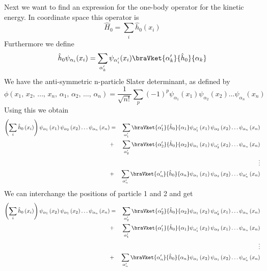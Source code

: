 Next we want to find an expression for the one-body operator for the kinetic energy. In coordinate space this operator is
\[
	\hat{H}_{0}=\sum_{i}\hat{h}_{0}(x_{i})
\]
Furthermore we define
\[
	\hat{h}_{0}\psi_{\alpha_{i}}(x_{i})=\sum_{\alpha_{k}'}\psi_{\alpha_{i}'}(x_{i}) \braVket{\alpha_{k}'}{\hat{h}_{0}}{\alpha_{k}}
\]
We have the anti-symmetric n-particle Slater determinant, as defined by
\[
	\phi\left(x_{1},\, x_{2},\,\dots,\, x_{n},\,\alpha_{1},\,\alpha_{2},\,\dots,\,\alpha_{n}\right)=\frac{1}{\sqrt{n!}}\sum_{p}\left(-1\right)^{p}\psi_{\alpha_{1}}\left(x_{1}\right)\psi_{\alpha_{2}}\left(x_{2}\right)\dots\psi_{\alpha_{n}}\left(x_{n}\right)
\]
Using this we obtain
\footnotesize
\begin{eqnarray*}
	\left(\sum_{i}\hat{h}_{0}\left(x_{i}\right)\right)\psi_{\alpha_{1}}\left(x_{1}\right)\psi_{\alpha_{2}}\left(x_{2}\right)\dots\psi_{\alpha_{n}}\left(x_{n}\right) & = & \sum_{\alpha_{1}'}\braVket{\alpha_{1}'}{\hat{h}_{0}}{\alpha_{1}}\psi_{\alpha_{1}'}\left(x_{1}\right)\psi_{\alpha_{2}}\left(x_{2}\right)\dots\psi_{\alpha_{n}}\left(x_{n}\right)\\
	 & + & \sum_{\alpha_{2}'}\braVket{\alpha_{2}'}{\hat{h}_{0}}{\alpha_{2}}\psi_{\alpha_{1}}\left(x_{1}\right)\psi_{\alpha_{2}'}\left(x_{2}\right)\dots\psi_{\alpha_{n}}\left(x_{n}\right)\\
	 &  & \vdots\\
	 & + & \sum_{\alpha_{n}'}\braVket{\alpha_{n}'}{\hat{h}_{0}}{\alpha_{n}}\psi_{\alpha_{1}}\left(x_{1}\right)\psi_{\alpha_{2}}\left(x_{2}\right)\dots\psi_{\alpha_{n}'}\left(x_{n}\right)
\end{eqnarray*}
\normalsize
We can interchange the positions of particle 1 and 2 and get
\footnotesize
\begin{eqnarray*}
	\left(\sum_{i}\hat{h}_{0}\left(x_{i}\right)\right)\psi_{\alpha_{1}}\left(x_{2}\right)\psi_{\alpha_{1}}\left(x_{2}\right)\dots\psi_{\alpha_{n}}\left(x_{n}\right) & = & \sum_{\alpha_{2}'}\braVket{\alpha_{2}'}{\hat{h}_{0}}{\alpha_{2}}\psi_{\alpha_{1}}\left(x_{2}\right)\psi_{\alpha_{2}'}\left(x_{1}\right)\dots\psi_{\alpha_{n}}\left(x_{n}\right)\\
	 & + & \sum_{\alpha_{1}'}\braVket{\alpha_{1}'}{\hat{h}_{0}}{\alpha_{1}}\psi_{\alpha_{1}'}\left(x_{2}\right)\psi_{\alpha_{2}}\left(x_{1}\right)\dots\psi_{\alpha_{n}}\left(x_{n}\right)\\
	 &  & \vdots\\
	 & + & \sum_{\alpha_{n}'}\braVket{\alpha_{n}'}{\hat{h}_{0}}{\alpha_{n}}\psi_{\alpha_{1}}\left(x_{2}\right)\psi_{\alpha_{1}}\left(x_{2}\right)\dots\psi_{\alpha_{n}'}\left(x_{n}\right)
\end{eqnarray*}
